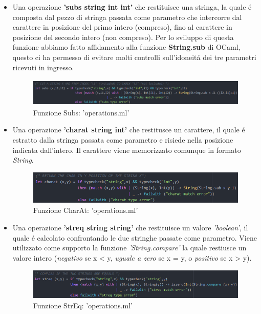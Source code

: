 \documentclass[a4paper,titlepage]{book}
\begin{document}
\begin{itemize}
\item Una operazione \textbf{'subs string int int'} che restituisce una stringa, la quale \'e composta dal pezzo di stringa passata come parametro che intercorre dal carattere in posizione del primo intero (compreso), fino al carattere in posizione del secondo intero (non compreso).
Per lo sviluppo di questa funzione abbiamo fatto affidamento alla funzione \textbf{String.sub} di OCaml, questo ci ha permesso di evitare molti controlli sull'idoneit\'a dei tre parametri ricevuti in ingresso.

\begin{figure}[H]
\center
\includegraphics[height=50px]{img/subs.png}
\caption{Funzione Subs: 'operations.ml' \label{fig:subs}}
\end{figure}
\clearpage

\item Una operazione \textbf{'charat string int'} che restitusce un carattere, il quale \'e estratto dalla stringa passata come parametro e risiede nella posizione indicata dall'intero. Il carattere viene memorizzato comunque in formato \textit{String}.

\begin{figure}[H]
\center
\includegraphics[height=60px]{img/charat.png}
\caption{Funzione CharAt: 'operations.ml' \label{fig:charat}}
\end{figure}

\item Una operazione \textbf{'streq string string'} che restituisce un valore \textit{'boolean'}, il quale \'e calcolato confrontando le due stringhe passate come parametro. Viene utilizzato come supporto la funzione \textit{'String.compare'} la quale restiusce un valore intero (\textit{negativo} se x < y, \textit{uguale a zero} se x = y, o \textit{positivo} se x > y).

\begin{figure}[H]
\center
\includegraphics[height=55px]{img/streq.png}
\caption{Funzione StrEq: 'operations.ml' \label{fig:streq}}
\end{figure}
\end{itemize}
\clearpage
\end{document}
